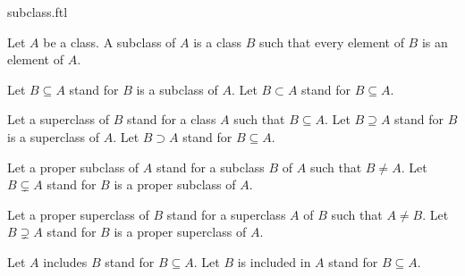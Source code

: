 \documentclass{stex}
\begin{document}
\begin{smodule}{subclass.ftl}

  \begin{forthel}
    \begin{definition}
      Let $A$ be a class.
      A subclass of $A$ is a class $B$ such that every element of $B$ is an element of $A$.
    \end{definition}

    Let $B \subseteq A$ stand for $B$ is a subclass of $A$.
    Let $B \subset A$ stand for $B \subseteq A$.

    Let a superclass of $B$ stand for a class $A$ such that $B \subseteq A$.
    Let $B \supseteq A$ stand for $B$ is a superclass of $A$.
    Let $B \supset A$ stand for $B \subseteq A$.

    Let a proper subclass of $A$ stand for a subclass $B$ of $A$ such that $B \neq A$.
    Let $B \subsetneq A$ stand for $B$ is a proper subclass of $A$.

    Let a proper superclass of $B$ stand for a superclass $A$ of $B$ such that   $A \neq B$.
    Let $B \supsetneq A$ stand for $B$ is a proper superclass of $A$.

    Let $A$ includes $B$ stand for $B \subseteq A$.
    Let $B$ is included in $A$ stand for $B \subseteq A$.
  \end{forthel}
\end{smodule}
\end{document}
